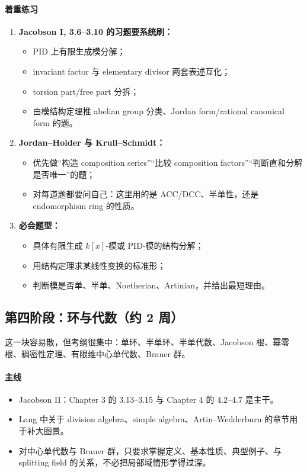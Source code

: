 \documentclass[12pt,a4paper]{ctexart}
\begin{document}
\paragraph{着重练习}
\begin{enumerate}
  \item \textbf{Jacobson I, 3.6--3.10 的习题要系统刷：}
  \begin{itemize}
    \item PID 上有限生成模分解；
    \item invariant factor 与 elementary divisor 两套表述互化；
    \item torsion part/free part 分拆；
    \item 由模结构定理推 abelian group 分类、Jordan form/rational canonical form 的题。
  \end{itemize}
  \item \textbf{Jordan--Holder 与 Krull--Schmidt：}
  \begin{itemize}
    \item 优先做“构造 composition series”“比较 composition factors”“判断直和分解是否唯一”的题；
    \item 对每道题都要问自己：这里用的是 ACC/DCC、半单性，还是 endomorphism ring 的性质。
  \end{itemize}
  \item \textbf{必会题型：}
  \begin{itemize}
    \item 具体有限生成 \(k[x]\)-模或 PID-模的结构分解；
    \item 用结构定理求某线性变换的标准形；
    \item 判断模是否单、半单、Noetherian、Artinian，并给出最短理由。
  \end{itemize}
\end{enumerate}

\subsection{第四阶段：环与代数（约 2 周）}

这一块容易散，但考纲很集中：单环、半单环、半单代数、Jacobson 根、幂零根、稠密性定理、有限维中心单代数、Brauer 群。

\paragraph{主线}
\begin{itemize}
  \item Jacobson II：Chapter 3 的 3.13--3.15 与 Chapter 4 的 4.2--4.7 是主干。
  \item Lang 中关于 division algebra、simple algebra、Artin--Wedderburn 的章节用于补大图景。
  \item 对中心单代数与 Brauer 群，只要求掌握定义、基本性质、典型例子、与 splitting field 的关系，不必把局部域情形学得过深。
\end{itemize}
\end{document}
